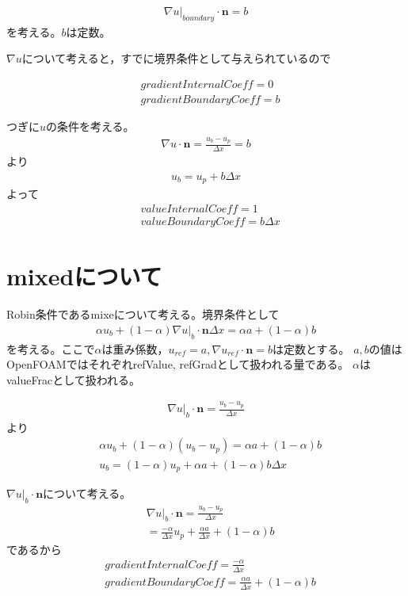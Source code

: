 \documentclass[a4paper,fleqn]{jsarticle}
\begin{document}
\begin{align}
 \nabla u|_{boundary} \cdot \bm{n}=b
\end{align}
を考える。$b$は定数。

$\nabla u$について考えると，すでに境界条件として与えられているので

\begin{align}
& gradientInternalCoeff=0 \\
& gradientBoundaryCoeff=b
\end{align}

つぎに$u$の条件を考える。
\begin{align}
 \nabla u\cdot \bm{n}=\frac{u_b-u_p}{\Delta x}=b
\end{align}
より
\begin{align}
 u_b=u_p+b\Delta x
\end{align}
よって
\begin{align}
& valueInternalCoeff=1 \\
& valueBoundaryCoeff=b\Delta x 
\end{align}


\section{mixedについて}
Robin条件であるmixeについて考える。境界条件として
\begin{align}
 \alpha u_b +(1-\alpha)\nabla u|_b \cdot \bm{n} \Delta x=\alpha a + (1-\alpha)b
\end{align}
を考える。ここで$\alpha$は重み係数，$u_{ref}=a,\nabla u_{ref}\cdot \bm{n}=b$は定数とする。
$a,b$の値はOpenFOAMではそれぞれrefValue, refGradとして扱われる量である。
$\alpha$はvalueFracとして扱われる。

\begin{align}
 \nabla u|_b\cdot \bm{n}=\frac{u_b-u_p}{\Delta x}
\end{align}
より
\begin{align}
 & \alpha u_b+(1-\alpha)(u_b-u_p)=\alpha a+(1-\alpha)b \\
 & u_b=(1-\alpha)u_p+\alpha a +(1-\alpha)b\Delta x
\end{align}

$\nabla u|_b \cdot \bm{n}$について考える。
\begin{align}
 & \nabla u|_b \cdot \bm{n}=\frac{u_b-u_p}{\Delta x} \\
 & =\frac{-\alpha}{\Delta x}u_p +\frac{\alpha a}{\Delta x} +(1-\alpha)b
\end{align}
であるから
\begin{align}
& gradientInternalCoeff=\frac{-\alpha}{\Delta x}\\
& gradientBoundaryCoeff=\frac{\alpha a}{\Delta x} +(1-\alpha)b
\end{align}
\end{document}
